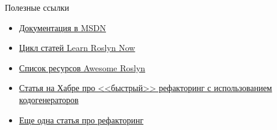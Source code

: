 \documentclass[aspectratio=169]{beamer}
\begin{document}
\begin{frame}{Полезные ссылки}
    \begin{itemize}
        \item \href{https://learn.microsoft.com/en-us/dotnet/csharp/roslyn-sdk/}{Документация в MSDN}
        \item \href{https://joshvarty.com/learn-roslyn-now/}{Цикл статей Learn Roslyn Now}
        \item \href{https://github.com/ironcev/awesome-roslyn}{Список ресурсов Awesome Roslyn}
        \item \href{https://habr.com/ru/company/veeam/blog/648775/}{Статья на Хабре про <<быстрый>> рефакторинг с использованием кодогенераторов}
        \item \href{https://lizzy-gallagher.github.io/roslyn-refactoring/}{Еще одна статья про рефакторинг}
    \end{itemize}
\end{frame}
\end{document}
